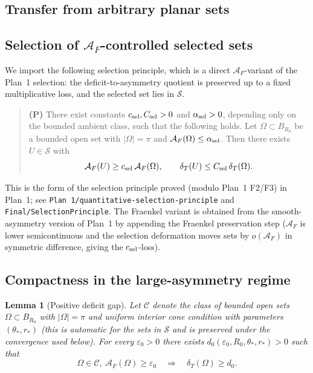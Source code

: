 \documentclass[11pt]{amsart}
\newtheorem{lemma}[theorem]{Lemma}
\newcommand{\dT}{\delta_T}
\newcommand{\AF}{\mathcal A_F}
\newcommand{\eps}{\varepsilon}
\newcommand{\Sclass}{\mathcal S}
\begin{document}
\subsection{Transfer from arbitrary planar sets}\label{sec:transfer}

\subsection{Selection of \(\AF\)-controlled selected sets}

We import the following selection principle, which is a direct
\(\AF\)-variant of the Plan~1 selection: the deficit-to-asymmetry
quotient is preserved up to a fixed multiplicative loss, and the
selected set lies in \(\Sclass\).

\begin{quote}
\textbf{(P)} There exist constants \(c_{\rm sel},C_{\rm sel}>0\) and
\(\alpha_{\rm sel}>0\), depending only on the bounded ambient class,
such that the following holds.  Let \(\Omega\subset B_{R_0}\) be a
bounded open set with \(|\Omega|=\pi\) and \(\AF(\Omega)\le
\alpha_{\rm sel}\).  Then there exists \(U\in\Sclass\) with
\begin{equation}\label{eq:selection}
   \AF(U)\ge c_{\rm sel}\,\AF(\Omega),
   \qquad
   \dT(U)\le C_{\rm sel}\,\dT(\Omega).
\end{equation}
\end{quote}

This is the form of the selection principle proved (modulo Plan~1
F2/F3) in Plan~1; see \texttt{Plan 1/quantitative-selection-principle}
and \texttt{Final/SelectionPrinciple}.  The Fraenkel variant is
obtained from the smooth-asymmetry version of Plan~1 by appending the
Fraenkel preservation step (\(\AF\) is lower semicontinuous and the
selection deformation moves sets by \(o(\AF)\) in symmetric difference,
giving the \(c_{\rm sel}\)-loss).

\subsection{Compactness in the large-asymmetry regime}

\begin{lemma}[Positive deficit gap]\label{lem:large-asymmetry}
Let \(\mathcal C\) denote the class of bounded open sets
\(\Omega\subset B_{R_0}\) with \(|\Omega|=\pi\) and uniform interior
cone condition with parameters \((\theta_*,r_*)\) (this is automatic
for the sets in \(\Sclass\) and is preserved under the convergence
used below).  For every \(\eps_0>0\) there exists
\(d_0(\eps_0,R_0,\theta_*,r_*)>0\) such that
\[
   \Omega\in\mathcal C,\ \AF(\Omega)\ge\eps_0\quad\Longrightarrow\quad
   \dT(\Omega)\ge d_0.
\]
\end{lemma}
\end{document}
